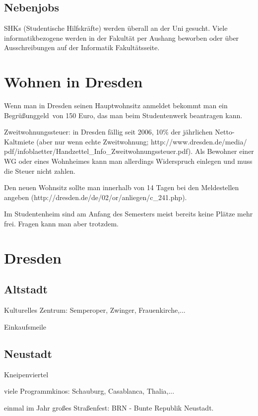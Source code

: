 \documentclass[a4paper,12pt]{report}
\begin{document}
\subsection{Nebenjobs}
SHKs (Studentische Hilfskräfte) werden überall an der Uni gesucht.
Viele informatikbezogene werden in der Fakultät per Aushang beworben oder über Ausschreibungen auf der Informatik Fakultätsseite.

\section{Wohnen in Dresden}
\begin{itemize*}
	\item Wenn man in Dresden seinen Hauptwohnsitz anmeldet bekommt man ein \glqq Begrüßunggeld\grqq\ von 150 Euro, das man beim Studentenwerk beantragen kann.
	\item Zweitwohnungssteuer: in Dresden fällig seit 2006, 10\% der jährlichen Netto-Kaltmiete (aber nur wenn echte Zweitwohnung; http://www.dresden.de/media/ pdf/infoblaetter/Handzettel\_Info\_Zweitwohnungssteuer.pdf).
	Als Bewohner einer WG oder eines Wohnheimes kann man allerdings Widerspruch einlegen und muss die Steuer nicht zahlen.
	\item Den neuen Wohnsitz sollte man innerhalb von 14 Tagen bei den Meldestellen angeben (http://dresden.de/de/02/or/anliegen/c\_241.php).
	\item Im Studentenheim sind am Anfang des Semesters meist bereits keine Plätze mehr frei.
	Fragen kann man aber trotzdem.
\end{itemize*}

\section{Dresden}

\subsection{Altstadt}
\begin{itemize*}
	\item Kulturelles Zentrum: Semperoper, Zwinger, Frauenkirche,...
	\item Einkaufsmeile
\end{itemize*}

\subsection{Neustadt}
\begin{itemize*}
	\item Kneipenviertel
	\item viele Programmkinos: Schauburg, Casablanca, Thalia,...
	\item einmal im Jahr großes Straßenfest: BRN - Bunte Republik Neustadt.
\end{itemize*}
\end{document}
